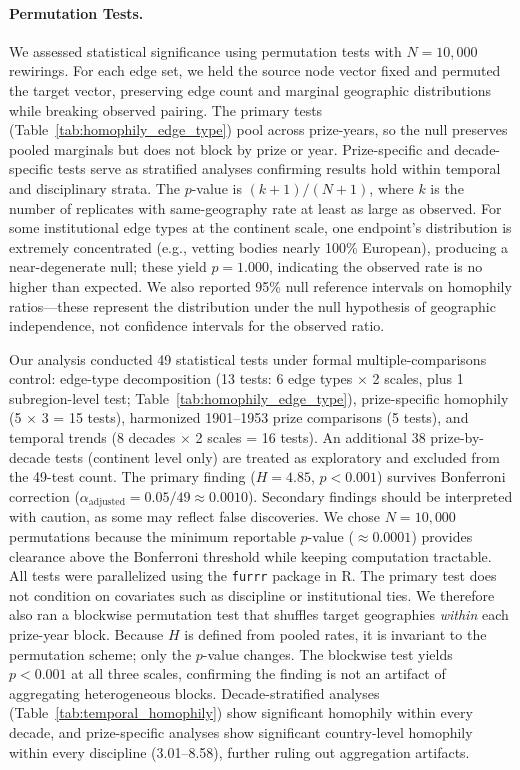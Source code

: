 \documentclass[12pt]{article}
\begin{document}
\paragraph*{Permutation Tests.}

We assessed statistical significance using permutation tests with $N = 10{,}000$ rewirings. For each edge set, we held the source node vector fixed and permuted the target vector, preserving edge count and marginal geographic distributions while breaking observed pairing. The primary tests (Table~\ref{tab:homophily_edge_type}) pool across prize-years, so the null preserves pooled marginals but does not block by prize or year. Prize-specific and decade-specific tests serve as stratified analyses confirming results hold within temporal and disciplinary strata. The $p$-value is $(k + 1) / (N + 1)$, where $k$ is the number of replicates with same-geography rate at least as large as observed. For some institutional edge types at the continent scale, one endpoint's distribution is extremely concentrated (e.g., vetting bodies nearly 100\% European), producing a near-degenerate null; these yield $p = 1.000$, indicating the observed rate is no higher than expected. We also reported 95\% null reference intervals on homophily ratios---these represent the distribution under the null hypothesis of geographic independence, not confidence intervals for the observed ratio.

Our analysis conducted 49 statistical tests under formal multiple-comparisons control: edge-type decomposition (13 tests: 6 edge types $\times$ 2 scales, plus 1 subregion-level test; Table~\ref{tab:homophily_edge_type}), prize-specific homophily (5 $\times$ 3 = 15 tests), harmonized 1901--1953 prize comparisons (5 tests), and temporal trends (8 decades $\times$ 2 scales = 16 tests). An additional 38 prize-by-decade tests (continent level only) are treated as exploratory and excluded from the 49-test count. The primary finding ($H = 4.85$, $p < 0.001$) survives Bonferroni correction ($\alpha_{\text{adjusted}} = 0.05/49 \approx 0.0010$). Secondary findings should be interpreted with caution, as some may reflect false discoveries. We chose $N = 10{,}000$ permutations because the minimum reportable $p$-value ($\approx 0.0001$) provides clearance above the Bonferroni threshold while keeping computation tractable. All tests were parallelized using the \texttt{furrr} package in R. The primary test does not condition on covariates such as discipline or institutional ties. We therefore also ran a blockwise permutation test that shuffles target geographies \emph{within} each prize-year block. Because $H$ is defined from pooled rates, it is invariant to the permutation scheme; only the $p$-value changes. The blockwise test yields $p < 0.001$ at all three scales, confirming the finding is not an artifact of aggregating heterogeneous blocks. Decade-stratified analyses (Table~\ref{tab:temporal_homophily}) show significant homophily within every decade, and prize-specific analyses show significant country-level homophily within every discipline (3.01--8.58), further ruling out aggregation artifacts.
\end{document}
